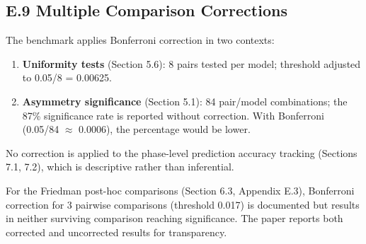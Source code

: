\subsection{E.9 Multiple Comparison Corrections}\label{e.9-multiple-comparison-corrections}

The benchmark applies Bonferroni correction in two contexts:

\begin{enumerate}
\def\labelenumi{\arabic{enumi}.}
\tightlist
\item
  \textbf{Uniformity tests} (Section 5.6): 8 pairs tested per model; threshold adjusted to 0.05/8 = 0.00625.
\item
  \textbf{Asymmetry significance} (Section 5.1): 84 pair/model combinations; the 87\% significance rate is reported without correction. With Bonferroni (0.05/84 \(\approx\) 0.0006), the percentage would be lower.
\end{enumerate}

No correction is applied to the phase-level prediction accuracy tracking (Sections 7.1, 7.2), which is descriptive rather than inferential.

For the Friedman post-hoc comparisons (Section 6.3, Appendix E.3), Bonferroni correction for 3 pairwise comparisons (threshold 0.017) is documented but results in neither surviving comparison reaching significance. The paper reports both corrected and uncorrected results for transparency.
